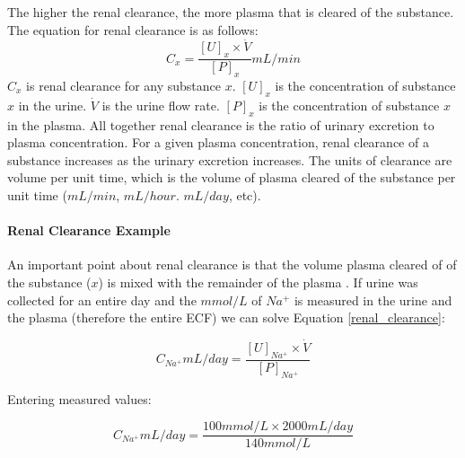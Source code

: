 The higher the renal clearance, the more plasma that is cleared of the substance. The equation for renal clearance is as follows:
\vspace{4mm}
\begin{equation}
    C_x = \frac{[U]_x \times \dot{V}}{[P]_x} mL/min
    \label{renal_clearance}
\end{equation}
\vspace{4mm}
$C_x$ is renal clearance for any substance $x$. $[U]_x$ is the concentration of substance $x$ in the urine. $\dot{V}$ is the urine flow rate. $[P]_x$ is the concentration of substance $x$ in the plasma. All together renal clearance is the ratio of urinary excretion to plasma concentration. For a given plasma concentration, renal clearance of a substance increases as the urinary excretion increases. The units of clearance are volume per unit time, which is the volume of plasma cleared of the substance per unit time ($mL/min$, $mL/hour$. $mL/day$, etc).

\paragraph{Renal Clearance Example}

An important point about renal clearance is that the volume plasma cleared of of the substance ($x$) is mixed with the remainder of the plasma \cite{richardson_addressing_2004}. If urine was collected for an entire day and the $mmol/L$ of $Na^+$ is measured in the urine and the plasma (therefore the entire ECF) we can solve Equation \ref{renal_clearance}:

\vspace{4mm}

\begin{equation}
    C_{Na^+} mL/day = \frac{[U]_{Na^+} \times \dot{V}}{[P]_{Na^+}}
    \label{Na_Clearance}
\end{equation}

\vspace{4mm}

Entering measured values:

\vspace{4mm}

\begin{equation}
    C_{Na^+} mL/day = \frac{100 mmol/L \times 2000 mL/day}{140 mmol/L}
    \label{Na_Clearance_Example}
\end{equation}

\vspace{4mm}

